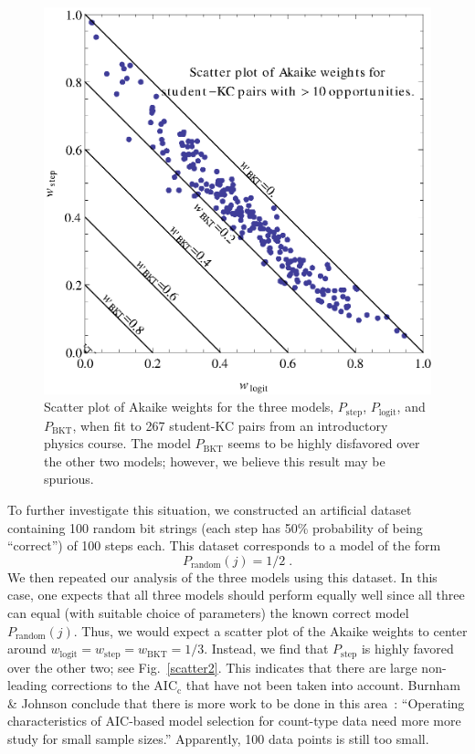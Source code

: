 \documentclass[11pt,letterpaper]{article}
\begin{document}
\begin{figure}
  \centering \includegraphics{scatter-weights.eps}
  \caption{Scatter plot of  Akaike weights for the three models, 
   $P_\mathrm{step}$, $P_\mathrm{logit}$, and $P_\mathrm{BKT}$, 
   when fit to 267 student-KC pairs from an introductory physics course.
   The model $P_\mathrm{BKT}$ seems to be highly disfavored over
   the other two models; however, we believe this result
   may be spurious.} \label{scatter1}
\end{figure}

To further investigate this situation, we constructed an
artificial dataset containing 100 random bit strings (each
step has 50\% probability of being ``correct'') of 100 steps each.
This dataset corresponds to a model of the form
%
\begin{equation}
        P_\mathrm{random}(j)=1/2 \; .
\end{equation}
%
We then repeated our analysis of the three models using this
dataset.  In this case, one expects that all three models 
should perform equally well since all three can equal 
(with suitable choice of parameters) the known correct model 
$P_\mathrm{random}(j)$.
Thus, we would expect a scatter plot of the Akaike weights to 
center around 
$w_\mathrm{logit}=w_\mathrm{step}=w_\mathrm{BKT}=1/3$.
Instead, we find that $P_\mathrm{step}$ is highly favored over
the other two; see Fig.~\ref{scatter2}.  
This indicates that there are large non-leading
corrections to the AIC$_\mathrm{c}$ that have not been
taken into account.  Burnham \& Johnson conclude 
that there is more work to be done in this area~\cite[p.~380]{aicbook}: 
``Operating characteristics
of AIC-based model selection for count-type data need more 
more study for small sample sizes.''  Apparently, 100 data points
is still too small.
\end{document}
